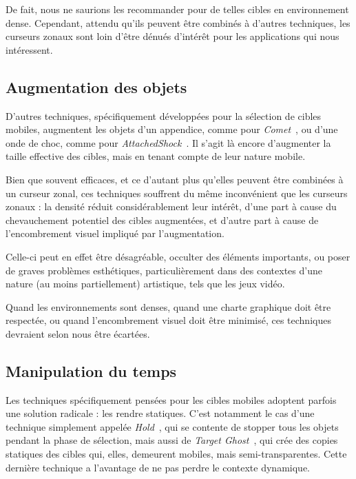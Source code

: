     De fait, nous ne saurions les recommander pour de telles cibles en environnement dense. Cependant, attendu qu'ils peuvent être combinés à d'autres techniques, les curseurs zonaux sont loin d'être dénués d'intérêt pour les applications qui nous intéressent.
    
    \subsection{Augmentation des objets}
    D'autres techniques, spécifiquement développées pour la sélection de cibles mobiles, augmentent les objets d'un appendice, comme pour \emph{Comet}~\cite{hasan2011comet}, ou d'une onde de choc, comme pour \emph{AttachedShock}~\cite{you2012attachedshock, you2014attachedshock}. Il s'agit là encore d'augmenter la taille effective des cibles, mais en tenant compte de leur nature mobile.
    
    Bien que souvent efficaces, et ce d'autant plus qu'elles peuvent être combinées à un curseur zonal, ces techniques souffrent du même inconvénient que les curseurs zonaux : la densité réduit considérablement leur intérêt, d'une part à cause du chevauchement potentiel des cibles augmentées, et d'autre part à cause de l'encombrement visuel impliqué par l'augmentation.
    
    Celle-ci peut en effet être désagréable, occulter des éléments importants, ou poser de graves problèmes esthétiques, particulièrement dans des contextes d'une nature (au moins partiellement) artistique, tels que les jeux vidéo.
    
    Quand les environnements sont denses, quand une charte graphique doit être respectée, ou quand l'encombrement visuel doit être minimisé, ces techniques devraient selon nous être écartées.
    
    \subsection{Manipulation du temps}
    Les techniques spécifiquement pensées pour les cibles mobiles adoptent parfois une solution radicale : les rendre statiques. C'est notamment le cas d'une technique simplement appelée \emph{Hold}~\cite{hajri2011moving}, qui se contente de stopper tous les objets pendant la phase de sélection, mais aussi de \emph{Target Ghost}~\cite{hasan2011comet}, qui crée des copies statiques des cibles qui, elles, demeurent mobiles, mais semi-transparentes. Cette dernière technique a l'avantage de ne pas perdre le contexte dynamique.
    
